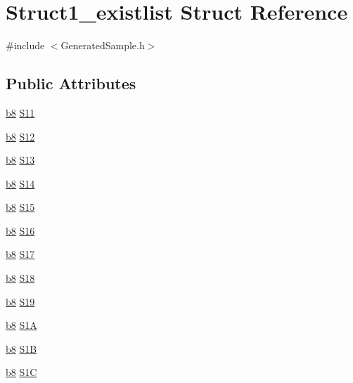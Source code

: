 \hypertarget{structStruct1__existlist}{}\section{Struct1\+\_\+existlist Struct Reference}
\label{structStruct1__existlist}


{\ttfamily \#include $<$Generated\+Sample.\+h$>$}

\subsection*{Public Attributes}
\begin{DoxyCompactItemize}
\item 
\hyperlink{ab__common_8h_a70e369648385b50f2d0588e8e8745275}{b8} \hyperlink{structStruct1__existlist_aa61b4cc419870281d6a1639db07dcbce}{S11}
\item 
\hyperlink{ab__common_8h_a70e369648385b50f2d0588e8e8745275}{b8} \hyperlink{structStruct1__existlist_a0acdbd7097744dd1c99f7bd0bd50b2eb}{S12}
\item 
\hyperlink{ab__common_8h_a70e369648385b50f2d0588e8e8745275}{b8} \hyperlink{structStruct1__existlist_ad58fec6927bad277f35e13a4c71b7db3}{S13}
\item 
\hyperlink{ab__common_8h_a70e369648385b50f2d0588e8e8745275}{b8} \hyperlink{structStruct1__existlist_ac0a0d2dd6866e584523d6aa52190e442}{S14}
\item 
\hyperlink{ab__common_8h_a70e369648385b50f2d0588e8e8745275}{b8} \hyperlink{structStruct1__existlist_a9abfba7ee78d15e14a4248ed4fedcfeb}{S15}
\item 
\hyperlink{ab__common_8h_a70e369648385b50f2d0588e8e8745275}{b8} \hyperlink{structStruct1__existlist_a997efd967c6b5e13c65358e6c29ec179}{S16}
\item 
\hyperlink{ab__common_8h_a70e369648385b50f2d0588e8e8745275}{b8} \hyperlink{structStruct1__existlist_afb44ba312d31074f7880f79784924f56}{S17}
\item 
\hyperlink{ab__common_8h_a70e369648385b50f2d0588e8e8745275}{b8} \hyperlink{structStruct1__existlist_acb455a93fe6fecd16ccc16a097d6de7d}{S18}
\item 
\hyperlink{ab__common_8h_a70e369648385b50f2d0588e8e8745275}{b8} \hyperlink{structStruct1__existlist_aef301f5d75575771e444965cb88df1c9}{S19}
\item 
\hyperlink{ab__common_8h_a70e369648385b50f2d0588e8e8745275}{b8} \hyperlink{structStruct1__existlist_a7f046abe604d113d70a4dd771a070dab}{S1A}
\item 
\hyperlink{ab__common_8h_a70e369648385b50f2d0588e8e8745275}{b8} \hyperlink{structStruct1__existlist_a9ff78445079c047dae43b4dedbfaee8f}{S1B}
\item 
\hyperlink{ab__common_8h_a70e369648385b50f2d0588e8e8745275}{b8} \hyperlink{structStruct1__existlist_a51481020415f093e99369044246b67dd}{S1C}
\end{DoxyCompactItemize}


